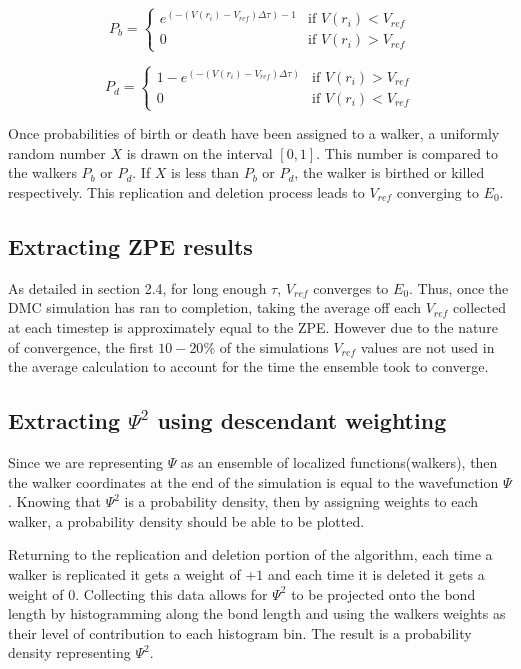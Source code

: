 \documentclass{article}
\begin{document}
\begin{equation}
P_b = \begin{cases}
e^{(-(V(r_{i})-V_{ref})\Delta\tau)-1} &\text{if $V(r_{i})<V_{ref}$}\\
0 &\text{if $V(r_{i})>V_{ref}$}
\end{cases}
\end{equation}

\begin{equation}
P_d = \begin{cases}
1-e^{(-(V(r_{i})-V_{ref})\Delta\tau)} &\text{if $V(r_{i})>V_{ref}$}\\
0 &\text{if $V(r_{i})<V_{ref}$}
\end{cases}
\end{equation}




Once probabilities of birth or death have been assigned to a walker, a uniformly random number $X$ is drawn on the interval $[0, 1]$. This number is compared to the walkers $P_{b}$ or $P_{d}$. If $X$ is less than $P_{b}$ or $P_{d}$, the walker is birthed or killed respectively. This replication and deletion process leads to $V_{ref}$ converging to $E_{0}$. 

\subsection{Extracting ZPE results}
As detailed in section 2.4, for long enough $\tau$, $V_{ref}$ converges to $E_{0}$. Thus, once the DMC simulation has ran to completion, taking the average off each $V_{ref}$ collected at each timestep is approximately equal to the ZPE. However due to the nature of convergence, the first $10-20\%$ of the simulations $V_{ref}$ values are not used in the average calculation to account for the time the ensemble took to converge. 


\subsection{Extracting $\Psi^2$ using descendant weighting}
Since we are representing $\Psi$ as an ensemble of localized functions(walkers), then the walker coordinates at the end of the simulation is equal to the wavefunction $\Psi$. Knowing that $\Psi^2$ is a probability density, then by assigning weights to each walker, a probability density should be able to be plotted. 

Returning to the replication and deletion portion of the algorithm, each time a walker is replicated it gets a weight of $+1$ and each time it is deleted it gets a weight of $0$. Collecting this data allows for $\Psi^2$ to be projected onto the bond length by histogramming along the bond length and using the walkers weights as their level of contribution to each histogram bin. The result is a probability density representing $\Psi^2$.
\end{document}
